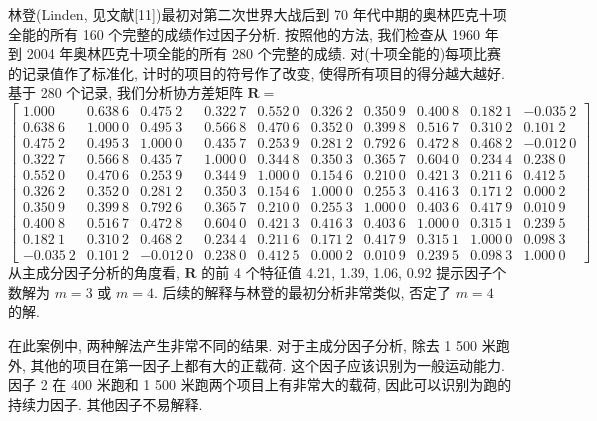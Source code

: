林登(Linden, 见文献[11])最初对第二次世界大战后到 70 年代中期的奥林匹克十项全能的所有 160 个完整的成绩作过因子分析. 按照他的方法, 我们检查从 1960 年到 2004 年奥林匹克十项全能的所有 280 个完整的成绩. 对(十项全能的)每项比赛的记录值作了标准化, 计时的项目的符号作了改变, 使得所有项目的得分越大越好. 基于 280 个记录, 我们分析协方差矩阵
$\mathbf{R}=$
{\small
\[
\begin{bmatrix}
1.000&0.638\ 6&0.475\ 2&0.322\ 7&0.552\ 0&0.326\ 2&0.350\ 9&0.400\ 8&0.182\ 1&-0.035\ 2\\
0.638\ 6&1.000\ 0&0.495\ 3&0.566\ 8&0.470\ 6&0.352\ 0&0.399\ 8&0.516\ 7&0.310\ 2&0.101\ 2\\
0.475\ 2&0.495\ 3&1.000\ 0&0.435\ 7&0.253\ 9&0.281\ 2&0.792\ 6&0.472\ 8&0.468\ 2&-0.012\ 0\\
0.322\ 7&0.566\ 8&0.435\ 7&1.000\ 0&0.344\ 8&0.350\ 3&0.365\ 7&0.604\ 0&0.234\ 4&0.238\ 0\\
0.552\ 0&0.470\ 6&0.253\ 9&0.344\ 9&1.000\ 0&0.154\ 6&0.210\ 0&0.421\ 3&0.211\ 6&0.412\ 5\\
0.326\ 2&0.352\ 0&0.281\ 2&0.350\ 3&0.154\ 6&1.000\ 0&0.255\ 3&0.416\ 3&0.171\ 2&0.000\ 2\\
0.350\ 9&0.399\ 8&0.792\ 6&0.365\ 7&0.210\ 0&0.255\ 3&1.000\ 0&0.403\ 6&0.417\ 9&0.010\ 9\\
0.400\ 8&0.516\ 7&0.472\ 8&0.604\ 0&0.421\ 3&0.416\ 3&0.403\ 6&1.000\ 0&0.315\ 1&0.239\ 5\\
0.182\ 1&0.310\ 2&0.468\ 2&0.234\ 4&0.211\ 6&0.171\ 2&0.417\ 9&0.315\ 1&1.000\ 0&0.098\ 3\\
-0.035\ 2&0.101\ 2&-0.012\ 0&0.238\ 0&0.412\ 5&0.000\ 2&0.010\ 9&0.239\ 5&0.098\ 3&1.000\ 0
\end{bmatrix}
\]
}
从主成分因子分析的角度看, $\mathbf{R}$ 的前 4 个特征值 4.21, 1.39, 1.06, 0.92 提示因子个数解为 $m=3$ 或 $m=4$. 后续的解释与林登的最初分析非常类似, 否定了 $m=4$ 的解.

在此案例中, 两种解法产生非常不同的结果. 对于主成分因子分析, 除去 1 500 米跑外, 其他的项目在第一因子上都有大的正载荷. 这个因子应该识别为一般运动能力. 因子 2 在 400 米跑和 1 500 米跑两个项目上有非常大的载荷, 因此可以识别为跑的持续力因子. 其他因子不易解释.

